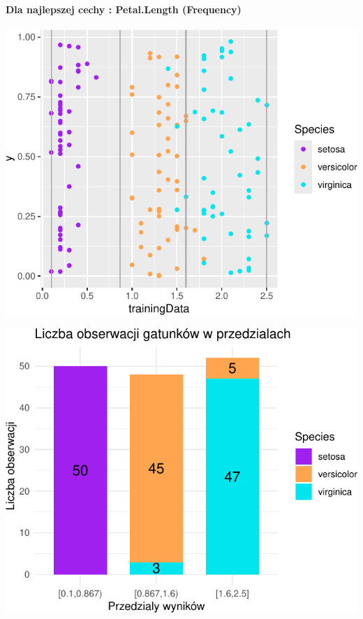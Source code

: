 \documentclass[
  12pt,
]{article}
\begin{document}
\paragraph{Dla najlepszej cechy : Petal.Length
(Frequency)}\label{dla-najlepszej-cechy-petal.length-frequency}

\begin{center}\includegraphics{Sprawozdanie2_files/figure-latex/frequences_najl-1} \end{center}

\begin{center}\includegraphics{Sprawozdanie2_files/figure-latex/tabela_kondygnacji_1_najl-1} \end{center}
\end{document}

